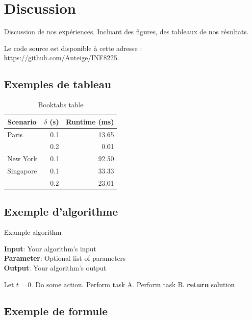 \documentclass{article}
\begin{document}
\section{Discussion}

Discussion de nos expériences. Incluant des figures, des tableaux de nos résultats.

Le code source est disponible à cette adresse : \url{https://github.com/Anteige/INF8225}.

\subsection{Exemples de tableau}

\begin{table}[htbp]
\centering
\begin{tabular}{lrr}  
\toprule
Scenario  & $\delta$ (s) & Runtime (ms) \\
\midrule
Paris       & 0.1  & 13.65      \\
            & 0.2  & 0.01       \\
New York    & 0.1  & 92.50      \\
Singapore   & 0.1  & 33.33      \\
            & 0.2  & 23.01      \\
\bottomrule
\end{tabular}
\caption{Booktabs table}
\label{tab:booktabs}
\end{table}

\subsection{Exemple d'algorithme}

\begin{algorithm}[htbp]
\caption{Example algorithm}
\label{alg:algorithm}
\textbf{Input}: Your algorithm's input\\
\textbf{Parameter}: Optional list of parameters\\
\textbf{Output}: Your algorithm's output
\begin{algorithmic}[1] %
\STATE Let $t=0$.
\STATE Do some action.
\STATE Perform task A.
\ELSE
\STATE Perform task B.
\ENDIF
\ENDWHILE
\STATE \textbf{return} solution
\end{algorithmic}
\end{algorithm}

\subsection{Exemple de formule}
\end{document}
